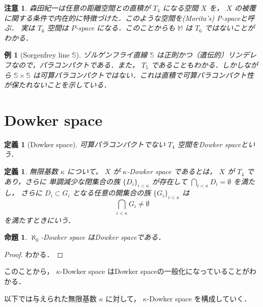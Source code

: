 \documentclass[leqno, 12pt]{ltjsarticle}
\newtheorem{prop}[thm]{命題}
\newtheorem{df}[thm]{定義}
\newtheorem{exam}[thm]{例}
\newtheorem*{rmk}{注意}
\newcommand{\MichaelLine}{\mathbb{M}}
\newcommand{\SorgenfreyLine}{\mathbb{S}}
\begin{document}
\begin{rmk}
森田紀一は任意の距離空間との直積が
$T_{4}$
になる空間
$X$
を，
$X$
の被覆に関する条件で内在的に特徴づけた．このような空間を(Morita's) P-spaceと呼ぶ．
実は
$T_{6}$
空間は
$P$-space
になる．このことからも
$\MichaelLine$
は
$T_{6}$
ではないことがわかる．
\end{rmk}

\begin{exam}[Sorgenfrey line $\SorgenfreyLine$]
ゾルゲンフライ直線
$\SorgenfreyLine$
は正則かつ（遺伝的）リンデレフなので，パラコンパクトである．また，
$T_{5}$
であることもわかる．しかしながら
$\SorgenfreyLine\times \SorgenfreyLine$
は可算パラコンパクトではない．これは直積で可算パラコンパクト性が保たれないことを示している．
\end{exam}






\section{Dowker space}

\begin{df}[Dowker space]
可算パラコンパクトでない
$T_{4}$
空間をDowker spaceという．
\end{df}

\begin{df}
無限基数
$\kappa$
について，
$X$
が
$\kappa$-Dowker space
であるとは，
$X$
が
$T_{4}$
であり，さらに
単調減少な閉集合の族
$\{D_{i}\}_{i<\kappa}$
が存在して
$\bigcap_{i<\kappa}D_{i}=\emptyset$
を満たし，
さらに
$D_{i}\subset G_{i}$
となる任意の開集合の族
$\{G_{i}\}_{i<\kappa}$
は
\[
\bigcap_{i<\kappa}G_{i}\neq\emptyset
\]
を満たすときにいう．
\end{df}

\begin{prop}
$\aleph_{0}$-Dowker space
はDowker spaceである．
\end{prop}
\begin{proof}
わかる．
\end{proof}
このことから，
$\kappa$-Dowker space
はDowker spaceの一般化になっていることがわかる．

以下では与えられた無限基数
$\kappa$
に対して，
$\kappa$-Dowker space
を構成していく．
\end{document}

